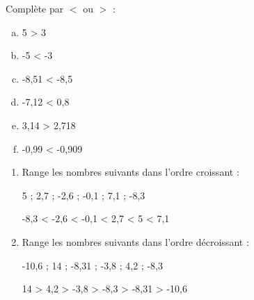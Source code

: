 \documentclass[a4paper,11pt]{article}
\begin{document}
\begin{question}[(3 points)]
	Complète par $<$ ou $>$ :

	\begin{multicols}{3}
		\begin{enumerate}[a)]
			\item 5 {\color{red} >} 3
			\item -5 {\color{red} <} -3
			\item -8,51 {\color{red} <} -8,5
			\item -7,12 {\color{red} <} 0,8
			\item 3,14 {\color{red} >} 2,718
			\item -0,99 {\color{red} <} -0,909
		\end{enumerate}
	\end{multicols}
\end{question}

\begin{question}[(2 points)]
	\begin{enumerate}[1)]
		\item Range les nombres suivants dans l'ordre croissant :

		      5 ; 2,7 ; -2,6 ; -0,1 ; 7,1 ; -8,3

		      {\color{red} -8,3 < -2,6 < -0,1 < 2,7 < 5 < 7,1}
		\item Range les nombres suivants dans l'ordre décroissant :

		      -10,6 ; 14 ; -8,31 ; -3,8 ; 4,2 ; -8,3

		      {\color{red} 14 > 4,2 > -3,8 > -8,3 > -8,31 > -10,6}
	\end{enumerate}
\end{question}
\end{document}
